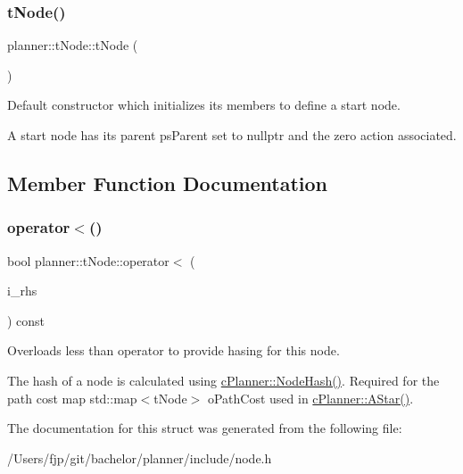 \subsubsection{\texorpdfstring{t\+Node()}{tNode()}}
{\footnotesize\ttfamily planner\+::t\+Node\+::t\+Node (\begin{DoxyParamCaption}{ }\end{DoxyParamCaption})\hspace{0.3cm}{\ttfamily [inline]}}



Default constructor which initializes its members to define a start node. 

A start node has its parent ps\+Parent set to nullptr and the zero action associated. 

\subsection{Member Function Documentation}
\mbox{\label{structplanner_1_1t_node_a5085f3fcf4a960ed9fe14068f1b5e950}} 
\subsubsection{\texorpdfstring{operator$<$()}{operator<()}}
{\footnotesize\ttfamily bool planner\+::t\+Node\+::operator$<$ (\begin{DoxyParamCaption}\item[{const \mbox{\hyperlink{structplanner_1_1t_node}{t\+Node}} \&}]{i\+\_\+rhs }\end{DoxyParamCaption}) const\hspace{0.3cm}{\ttfamily [inline]}}



Overloads less than operator to provide hasing for this node. 

The hash of a node is calculated using \mbox{\hyperlink{classplanner_1_1c_planner_a4c99873ce64b214899d65eda6366455f}{c\+Planner\+::\+Node\+Hash()}}. Required for the path cost map std\+::map$<$t\+Node$>$ o\+Path\+Cost used in \mbox{\hyperlink{classplanner_1_1c_planner_a341e70531266f023ac9461d18979d1ef}{c\+Planner\+::\+A\+Star()}}. 

The documentation for this struct was generated from the following file\+:\begin{DoxyCompactItemize}
\item 
/\+Users/fjp/git/bachelor/planner/include/node.\+h\end{DoxyCompactItemize}
